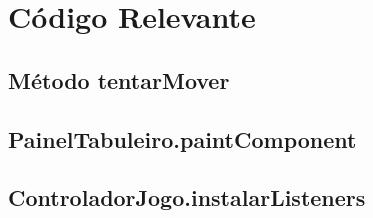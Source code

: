 \documentclass[12pt,a4paper]{report}
\begin{document}
\appendix

\chapter{Código Relevante}

\section{Método tentarMover}



\section{PainelTabuleiro.paintComponent}



\section{ControladorJogo.instalarListeners}


\end{document}
